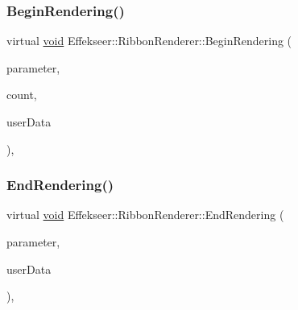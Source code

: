 \subsubsection{\texorpdfstring{Begin\+Rendering()}{BeginRendering()}}
{\footnotesize\ttfamily virtual \mbox{\hyperlink{namespace_effekseer_ab34c4088e512200cf4c2716f168deb56}{void}} Effekseer\+::\+Ribbon\+Renderer\+::\+Begin\+Rendering (\begin{DoxyParamCaption}\item[{const \mbox{\hyperlink{struct_effekseer_1_1_ribbon_renderer_1_1_node_parameter}{Node\+Parameter}} \&}]{parameter,  }\item[{int32\+\_\+t}]{count,  }\item[{\mbox{\hyperlink{namespace_effekseer_ab34c4088e512200cf4c2716f168deb56}{void}} $\ast$}]{user\+Data }\end{DoxyParamCaption})\hspace{0.3cm}{\ttfamily [inline]}, {\ttfamily [virtual]}}

\mbox{\label{class_effekseer_1_1_ribbon_renderer_ae8e99c5d635d3128047017c0f3c595bd}} 
\subsubsection{\texorpdfstring{End\+Rendering()}{EndRendering()}}
{\footnotesize\ttfamily virtual \mbox{\hyperlink{namespace_effekseer_ab34c4088e512200cf4c2716f168deb56}{void}} Effekseer\+::\+Ribbon\+Renderer\+::\+End\+Rendering (\begin{DoxyParamCaption}\item[{const \mbox{\hyperlink{struct_effekseer_1_1_ribbon_renderer_1_1_node_parameter}{Node\+Parameter}} \&}]{parameter,  }\item[{\mbox{\hyperlink{namespace_effekseer_ab34c4088e512200cf4c2716f168deb56}{void}} $\ast$}]{user\+Data }\end{DoxyParamCaption})\hspace{0.3cm}{\ttfamily [inline]}, {\ttfamily [virtual]}}

\mbox{\label{class_effekseer_1_1_ribbon_renderer_a3d1991348eeba97aa02c8082455edd39}} 
